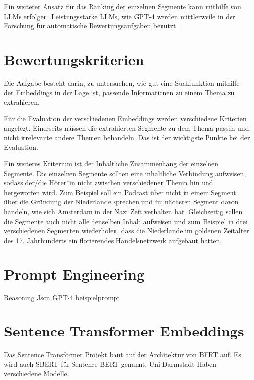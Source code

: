 Ein weiterer Ansatz für das Ranking der einzelnen Segmente kann mithilfe von LLMs erfolgen.
Leistungsstarke LLMs, wie GPT-4 werden mittlerweile in der Forschung für automatische Bewertungsaufgaben benutzt~\cite{naismith2023}~\cite{nilsson2023}.



\section{Bewertungskriterien}


Die Aufgabe besteht darin, zu untersuchen, wie gut eine Suchfunktion mithilfe der Embeddings in der Lage ist, passende Informationen zu einem Thema zu extrahieren.

Für die Evaluation der verschiedenen Embeddings werden verschiedene Kriterien angelegt.
Einerseits müssen die extrahierten Segmente zu dem Thema passen und nicht irrelevante andere Themen behandeln.
Das ist der wichtigste Punkte bei der Evaluation.

Ein weiteres Kriterium ist der Inhaltliche Zusammenhang der einzelnen Segmente.
Die einzelnen Segmente sollten eine inhaltliche Verbindung aufweisen, sodass der/die Hörer*in nicht zwischen verschiedenen Themn hin und hergeworfen wird.
Zum Beispiel soll ein Podcast über  nicht in einem Segment über die Gründung der Niederlande sprechen und im nächsten Segment davon handeln, wie sich Amsterdam in der Nazi Zeit verhalten hat.
Gleichzeitig sollen die Segmente auch nicht alle denselben Inhalt aufweisen und zum Beispiel in drei verschiedenen Segmenten wiederholen, dass die Niederlande im goldenen Zeitalter des 17. Jahrhunderts ein florierendes Handelsnetzwerk aufgebaut hatten.
 


\section{Prompt Engineering}

Reasoning
Json
GPT-4
beispielprompt


 


\section{Sentence Transformer Embeddings}

Das Sentence Transformer Projekt baut auf der Architektur von BERT auf. 
Es wird auch SBERT für Sentence BERT genannt. 
Uni Darmstadt
Haben verschiedene Modelle.

